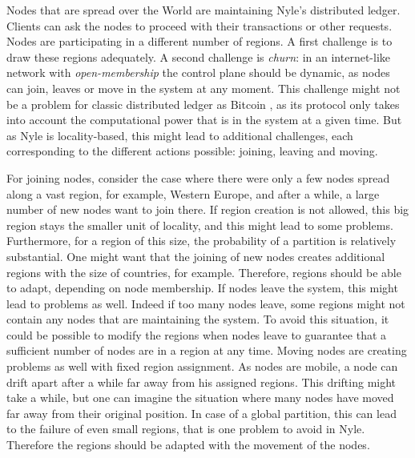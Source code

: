 \documentclass[a4paper,11pt,twoside=semi,openright]{report}
\begin{document}
Nodes that are spread over the World are maintaining Nyle's distributed ledger.
Clients can ask the nodes to proceed with their transactions or other requests.
Nodes are participating in a different number of regions. A first challenge is
to draw these regions adequately. A second challenge is \textit{churn}: in an
internet-like network with \textit{open-membership} the control plane should be
dynamic, as nodes can join, leaves or move in the system at any moment. This
challenge might not be a problem for classic distributed ledger as Bitcoin
\cite{Nakamoto2009}, as its protocol only takes into account the computational
power that is in the system at a given time. But as Nyle is locality-based,
this might lead to additional challenges, each corresponding to the different
actions possible: joining, leaving and moving.

For joining nodes, consider the case where there were only a few nodes spread
along a vast region, for example, Western Europe, and after a while, a large
number of new nodes want to join there. If region creation is not allowed, this
big region stays the smaller unit of locality, and this might lead to some
problems.  Furthermore, for a region of this size, the probability of a
partition is relatively substantial. One might want that the joining of new
nodes creates additional regions with the size of countries, for example.
Therefore, regions should be able to adapt, depending on node membership. If
nodes leave the system, this might lead to problems as well. Indeed if too many
nodes leave, some regions might not contain any nodes that are maintaining the
system. To avoid this situation, it could be possible to modify the regions
when nodes leave to guarantee that a sufficient number of nodes are in a region
at any time. Moving nodes are creating problems as well with fixed region
assignment. As nodes are mobile, a node can drift apart after a while far away
from his assigned regions. This drifting might take a while, but one can
imagine the situation where many nodes have moved far away from their original
position. In case of a global partition, this can lead to the failure of even
small regions, that is one problem to avoid in Nyle. Therefore the regions
should be adapted with the movement of the nodes. 
\end{document}
